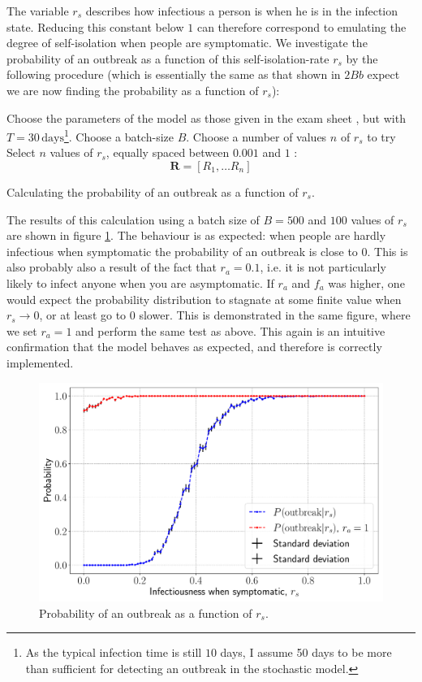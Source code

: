 The variable $r_s$ describes how infectious a person is when he is in the infection state. Reducing this constant below $1$ can therefore correspond to emulating the degree of self-isolation when people are symptomatic. We investigate the probability of an outbreak as a function of this self-isolation-rate $r_s$ by the following procedure (which is essentially the same as that shown in $2Bb$ expect we are now finding the probability as a function of $r_s$):

\begin{algorithm}[htb]
	Choose the parameters of the model as those given in the exam sheet \cite{sheet}, but with $T = 30 \, \mathrm{days}$\footnote{As the typical infection time is still $10$ days, I assume 50 days to be more than sufficient for detecting an outbreak in the stochastic model.}. \;
	Choose a batch-size $B$.\;
	Choose a number of values $n$ of $r_s$ to try\;
	Select $n$ values of $r_s$, equally spaced between $0.001$ and $1$ :
		$$
			\mathbf{R} = [R_1, \dots R_n]
		$$
	\caption{Calculating the probability of an outbreak as a function of $r_s$.}
\end{algorithm} 

The results of this calculation using a batch size of $B = 500$ and $100$ values of $r_s$ are shown in figure \ref{fig:rs_prob}. The behaviour is as expected: when people are hardly infectious when symptomatic the probability of an outbreak is close to $0$. This is also probably also a result of the fact that $r_a = 0.1$, i.e. it is not particularly likely to infect anyone when you are asymptomatic. If $r_a$ and $f_a$ was higher, one would expect the probability distribution to stagnate at some finite value when $r_s \to 0$, or at least go to $0$ slower. This is demonstrated in the same figure, where we set $r_a = 1$ and perform the same test as above. This again is an intuitive confirmation that the model behaves as expected, and therefore is correctly implemented.

\begin{figure}[htb]
	\centering
	\includegraphics[width=0.8\columnwidth]{../fig/2Cb_probs.pdf}
	\caption{Probability of an outbreak as a function of $r_s$.}
	\label{fig:rs_prob}
\end{figure}


\clearpage